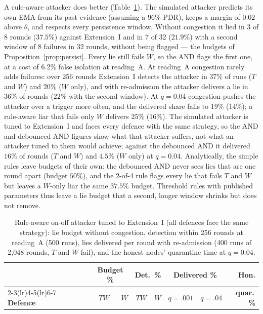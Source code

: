 A rule-aware attacker does better (Table~\ref{tab:aware}).  The
simulated attacker predicts its own EMA from its past evidence
(assuming a $96\%$ PDR), keeps a margin of $0.02$ above $\theta$, and
respects every persistence window.  Without congestion it lied in $3$ of
$8$ rounds ($37.5\%$) against Extension~I and in $7$ of $32$ ($21.9\%$)
with a second window of $8$ failures in $32$ rounds, without being
flagged --- the budgets of Proposition~\ref{prop:persist}.  Every lie
still fails $W$, so the AND flags the first one, at a cost of $6.2\%$
false isolation at reading~A.  At reading~A congestion rarely adds
failures: over 256 rounds Extension~I detects the attacker in $37\%$ of
runs ($T$ and $W$) and $20\%$ ($W$ only), and with re-admission the
attacker delivers a lie in $36\%$ of rounds ($22\%$ with the second
window).  At $q=0.04$ congestion pushes the attacker over a trigger more
often, and the delivered share falls to $19\%$ ($14\%$); a rule-aware
liar that fails only $W$ delivers $25\%$ ($16\%$).  The simulated
attacker is tuned to Extension~I and faces every defence with the
same strategy, so the AND and debounced-AND figures show what that
attacker suffers, not what an attacker tuned to them would achieve;
against the debounced AND it delivered $16\%$ of rounds ($T$ and $W$)
and $4.5\%$ ($W$ only) at $q=0.04$.  Analytically, the simple rules
leave budgets of their own: the debounced AND never sees lies that
are one round apart (budget $50\%$), and the 2-of-4 rule flags every
lie that fails $T$ and $W$ but leaves a $W$-only liar the same
$37.5\%$ budget.  Threshold rules with published parameters thus leave
a lie budget that a second, longer window shrinks but does not remove.

\begin{table}[!t]
\caption{Rule-aware on-off attacker tuned to Extension~I (all defences face the same strategy): lie budget without congestion, detection within 256 rounds at reading~A (500 runs), lies delivered per round with re-admission (400 runs of 2{,}048 rounds, $T$ and $W$ fail), and the honest nodes' quarantine time at $q=0.04$.}
\label{tab:aware}
\centering
\renewcommand{\arraystretch}{1.08}
\footnotesize
\setlength{\tabcolsep}{2.0pt}
\begin{tabular}{lrrrrrrr}
\toprule
 & \multicolumn{2}{c}{\textbf{Budget \%}} & \multicolumn{2}{c}{\textbf{Det.\ \%}} & \multicolumn{2}{c}{\textbf{Delivered \%}} & \textbf{Hon.} \\
\cmidrule(lr){2-3}\cmidrule(lr){4-5}\cmidrule(lr){6-7}
\textbf{Defence} & $TW$ & $W$ & $TW$ & $W$ & $q{=}.001$ & $q{=}.04$ & \textbf{quar.\,\%} \\
\midrule
\bottomrule
\end{tabular}
\end{table}

